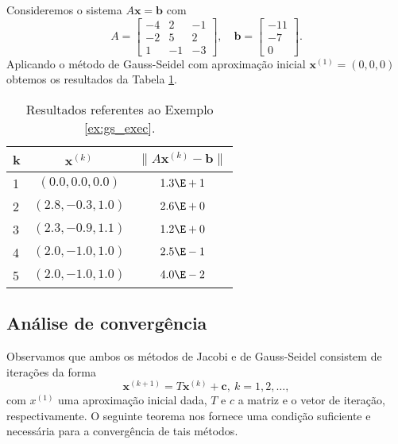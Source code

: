 \begin{ex}\label{ex:gs_exec}
  Consideremos o sistema $A\pmb{x} = \pmb{b}$ com
  \begin{equation}
    A =
    \begin{bmatrix}
      -4 & 2 & -1 \\
      -2 & 5 & 2 \\
       1 & -1 & -3
    \end{bmatrix},\quad
    \pmb{b} =
    \begin{bmatrix}
      -11\\ -7\\ 0
    \end{bmatrix}.
  \end{equation}
  Aplicando o método de Gauss-Seidel com aproximação inicial $\pmb{x}^{(1)} = (0, 0, 0)$ obtemos os resultados da Tabela \ref{tab:ex_gs_exec}.

  \begin{table}[h!]
    \centering
    \begin{tabular}{l|cc}
      k & $\pmb{x}^{(k)}$ & $\|A\pmb{x}^{(k)}-\pmb{b}\|$\\\hline
      1 & $(0.0, 0.0, 0.0)$ & $1.3\E+1$ \\
      2 & $(2.8, -0.3, 1.0)$ & $2.6\E+0$ \\
      3 & $(2.3, -0.9, 1.1)$ & $1.2\E+0$ \\
      4 & $(2.0, -1.0, 1.0)$ & $2.5\E-1$ \\
      5 & $(2.0, -1.0, 1.0)$ & $4.0\E-2$ \\\hline
    \end{tabular}
    \caption{Resultados referentes ao Exemplo \ref{ex:gs_exec}.}
    \label{tab:ex_gs_exec}
  \end{table}

% 
\end{ex}

\subsection{Análise de convergência}

Observamos que ambos os métodos de Jacobi e de Gauss-Seidel consistem de iterações da forma
\begin{equation}
  \pmb{x}^{(k+1)} = T\pmb{x}^{(k)} + \pmb{c},~k=1, 2, \ldots,\label{eq:jgs_iter}
\end{equation}
com $x^{(1)}$ uma aproximação inicial dada, $T$ e $c$ a matriz e o vetor de iteração, respectivamente. O seguinte teorema nos fornece uma condição suficiente e necessária para a convergência de tais métodos.

